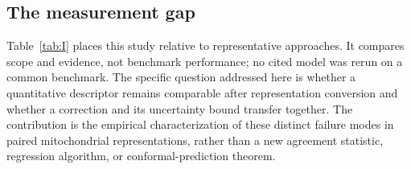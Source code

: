 \documentclass[journal]{IEEEtran}
\begin{document}
\subsection{The measurement gap}

Table~\ref{tab:I} places this study relative to representative approaches. It compares scope and evidence, not benchmark performance; no cited model was rerun on a common benchmark. The specific question addressed here is whether a quantitative descriptor remains comparable after representation conversion and whether a correction and its uncertainty bound transfer together. The contribution is the empirical characterization of these distinct failure modes in paired mitochondrial representations, rather than a new agreement statistic, regression algorithm, or conformal-prediction theorem.
\end{document}
